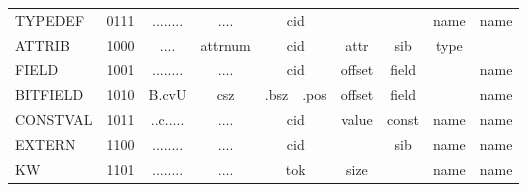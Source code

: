 \begin{table}[p]
\begin{tabular}{l|c|c|c|c|c|l|c|c|c|c|}
\multicolumn{1}{|l|}{TYPEDEF}  & 0111 & \multicolumn{2}{c|}{........}       & ....      & \multicolumn{2}{c|}{cid} &                       &                      & name                  & name                  \\
\multicolumn{1}{|l|}{ATTRIB}   & 1000 & ....             & \multicolumn{2}{c|}{attrnum} & \multicolumn{2}{c|}{cid} & attr                  & sib                  & type                  &                       \\
\multicolumn{1}{|l|}{FIELD}    & 1001 & \multicolumn{2}{c|}{........}       & ....      & \multicolumn{2}{c|}{cid} & offset                & field                &                       & name                  \\
\multicolumn{1}{|l|}{BITFIELD} & 1010 & B.cvU            & \multicolumn{2}{c|}{csz}     & .bsz        & .pos       & offset                & field                &                       & name                  \\
\multicolumn{1}{|l|}{CONSTVAL} & 1011 & \multicolumn{2}{c|}{..c.....}       & ....      & \multicolumn{2}{c|}{cid} & value                 & const                & name                  & name                  \\
\multicolumn{1}{|l|}{EXTERN}   & 1100 & \multicolumn{2}{c|}{........}       & ....      & \multicolumn{2}{c|}{cid} &                       & sib                  & name                  & name                  \\
\multicolumn{1}{|l|}{KW}       & 1101 & \multicolumn{2}{c|}{........}       & ....      & \multicolumn{2}{c|}{tok} & size                  &                      & name                  & name                  \\ \hline
\end{tabular}
\end{table}

